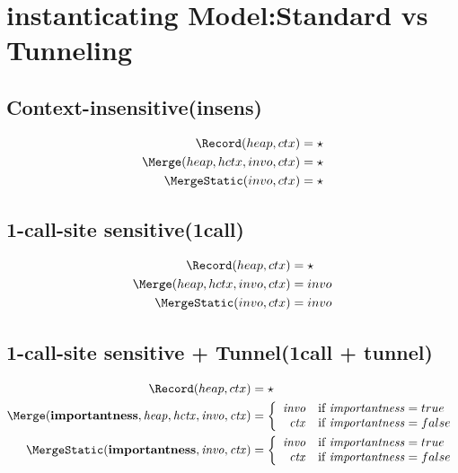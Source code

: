 \section{instanticating Model:Standard vs Tunneling}

\subsection{Context-insensitive(insens)}
\begin{align*}
	\Record (heap, ctx) &=\star\\
	\Merge(heap, hctx, invo, ctx)&=\star\\
	\MergeStatic(invo, ctx)&=\star\\
\end{align*}

\subsection{1-call-site sensitive(1call)}


\begin{align*}
	\Record (heap, ctx) &=\star\\
	\Merge(heap, hctx, invo, ctx) &= invo\\
	\MergeStatic(invo, ctx)&=invo\\
\end{align*}

\subsection{1-call-site sensitive + Tunnel(1call + tunnel)}
\begin{align*}
\Record (heap, ctx) &=\star\\
\Merge ({\it \textbf{importantness}, heap, hctx, invo, ctx}) &= \left\{
 \begin{array}{rl}
{\it invo} & \mbox{if}~{\it importantness} = true \\
{\it ctx} & \mbox{if}~{\it importantness}=false
\end{array}
\right.\\
\MergeStatic ({\it \textbf{importantness}, invo, ctx}) &= \left\{
\begin{array}{rl}
{\it invo} & \mbox{if}~{\it importantness} = true \\
{\it ctx} & \mbox{if}~{\it importantness}=false
\end{array}
\right.\\
\end{align*}

